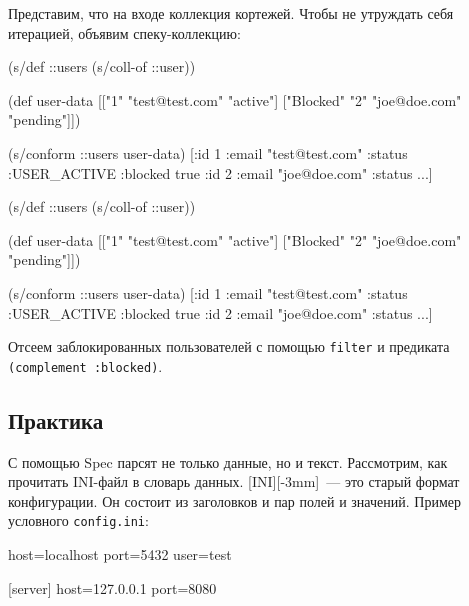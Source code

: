 Представим, что на входе коллекция кортежей. Чтобы не утруждать себя итерацией,
объявим спеку-коллекцию:

\ifx\devicetype\mobile

\begin{english}
  \begin{clojure}
(s/def ::users (s/coll-of ::user))

(def user-data
  [["1" "test@test.com" "active"]
   ["Blocked" "2" "joe@doe.com"
    "pending"]])

(s/conform ::users user-data)
[{:id 1
  :email "test@test.com"
  :status :USER_ACTIVE}
 {:blocked true
  :id 2
  :email "joe@doe.com"
  :status ...}]
  \end{clojure}
\end{english}

\else

\begin{english}
  \begin{clojure}
(s/def ::users (s/coll-of ::user))

(def user-data
  [["1" "test@test.com" "active"]
   ["Blocked" "2" "joe@doe.com" "pending"]])

(s/conform ::users user-data)
[{:id 1 :email "test@test.com" :status :USER_ACTIVE}
 {:blocked true :id 2 :email "joe@doe.com" :status ...}]
  \end{clojure}
\end{english}

\fi


Отсеем заблокированных пользователей с помощью \verb|filter| и предиката
\texttt{(complement :blocked)}.

\subsection{Практика}


С помощью Spec парсят не только данные, но и текст. Рассмотрим, как прочитать
INI-файл в словарь данных. [INI][-3mm]~---
это старый формат конфигурации. Он состоит из заголовков и пар полей и
значений. Пример условного \verb|config.ini|:

\begin{english}
  \begin{ini}
[database]
host=localhost
port=5432
user=test

[server]
host=127.0.0.1
port=8080
  \end{ini}
\end{english}

